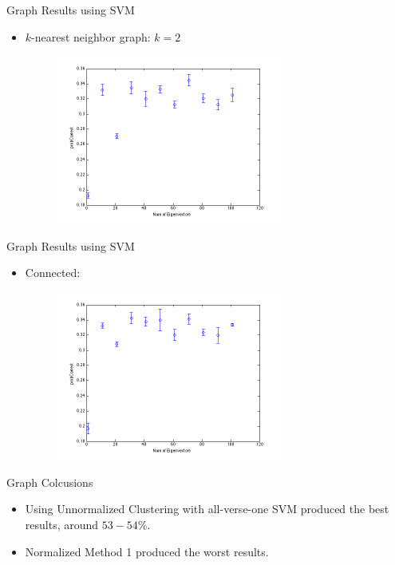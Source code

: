 \documentclass[xcolor=dvipsnames,t]{beamer} %
\begin{document}
\begin{frame}{Graph Results using SVM}
\begin{itemize}
\item $k$-nearest neighbor graph: $k=2$ 
\begin{figure}[h!]
  \centering
    \includegraphics[width=0.7\textwidth]{figures/plotopt2k2n2.png}
\end{figure}
\end{itemize}
\end{frame}
\begin{frame}{Graph Results using SVM}
\begin{itemize}
\item Connected:  
\begin{figure}[h!]
  \centering
    \includegraphics[width=0.7\textwidth]{figures/plotopt3n2.png}
\end{figure}
\end{itemize}
\end{frame}

\begin{frame}{Graph Colcusions}
\begin{itemize}
\item Using Unnormalized Clustering with all-verse-one SVM produced the best results, around $53-54\%$. 
\item Normalized Method 1 produced the worst results. 
\end{itemize}
\end{frame}
\end{document}
